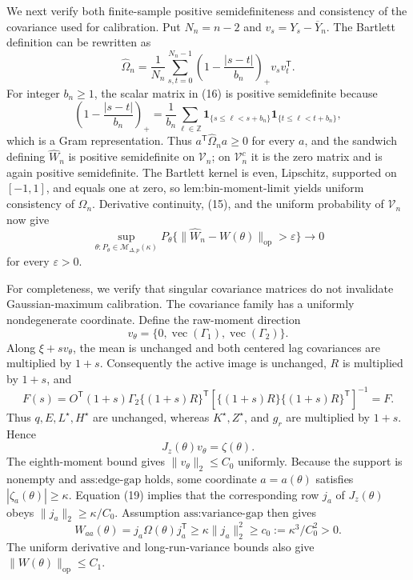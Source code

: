 We next verify both finite-sample positive semidefiniteness and consistency of the covariance used for calibration.  Put \(N_n=n-2\) and \(v_s=Y_s-\overline Y_n\).  The Bartlett definition can be rewritten as
\[
 \widehat\Omega_n
 =\frac1{N_n}\sum_{s,t=0}^{N_n-1}
 \left(1-\frac{|s-t|}{b_n}\right)_{+}v_sv_t^{\mathsf T}.
\tag{16}
\]
For integer \(b_n\geq1\), the scalar matrix in (16) is positive semidefinite because
\[
 \left(1-\frac{|s-t|}{b_n}\right)_{+}
 =\frac1{b_n}\sum_{\ell\in\mathbb Z}
 \mathbf1_{\{s\leq\ell<s+b_n\}}
 \mathbf1_{\{t\leq\ell<t+b_n\}},
\tag{17}
\]
which is a Gram representation.  Thus \(a^{\mathsf T}\widehat\Omega_n a\geq0\) for every \(a\), and the sandwich defining \(\widehat W_n\) is positive semidefinite on \(\mathcal V_n\); on \(\mathcal V_n^c\) it is the zero matrix and is again positive semidefinite.  The Bartlett kernel is even, Lipschitz, supported on \([-1,1]\), and equals one at zero, so \(\text{lem:bin-moment-limit}\) yields uniform consistency of \(\widehat\Omega_n\).  Derivative continuity, (15), and the uniform probability of \(\mathcal V_n\) now give
\[
 \sup_{\theta:P_\theta\in\mathcal M_{\Delta,p}(\kappa)}
 P_\theta\{\lVert\widehat W_n-W(\theta)\rVert_{\mathrm{op}}>\varepsilon\}
 \longrightarrow0
\tag{18}
\]
for every \(\varepsilon>0\).

For completeness, we verify that singular covariance matrices do not invalidate Gaussian-maximum calibration.  The covariance family has a uniformly nondegenerate coordinate.  Define the raw-moment direction
\[
 v_\theta=\{0,\operatorname{vec}(\Gamma_1),\operatorname{vec}(\Gamma_2)\}.
\]
Along \(\xi+s v_\theta\), the mean is unchanged and both centered lag covariances are multiplied by \(1+s\).  Consequently the active image is unchanged, \(R\) is multiplied by \(1+s\), and
\[
 F(s)=O^{\mathsf T}(1+s)\Gamma_2\{(1+s)R\}^{\mathsf T}
 \left[\{(1+s)R\}\{(1+s)R\}^{\mathsf T}\right]^{-1}=F.
\]
Thus \(q,E,L^\star,H^\star\) are unchanged, whereas \(K^\star,Z^\star\), and \(g_r\) are multiplied by \(1+s\).  Hence
\[
 J_z(\theta)v_\theta=\zeta(\theta).
\tag{19}
\]
The eighth-moment bound gives \(\lVert v_\theta\rVert_2\leq C_0\) uniformly.  Because the support is nonempty and \(\text{ass:edge-gap}\) holds, some coordinate \(a=a(\theta)\) satisfies \(|\zeta_a(\theta)|\geq\kappa\).  Equation (19) implies that the corresponding row \(j_a\) of \(J_z(\theta)\) obeys \(\lVert j_a\rVert_2\geq\kappa/C_0\).  Assumption \(\text{ass:variance-gap}\) then gives
\[
 W_{aa}(\theta)=j_a\Omega(\theta)j_a^{\mathsf T}
 \geq\kappa\lVert j_a\rVert_2^2
 \geq c_0:=\kappa^3/C_0^2>0.
\tag{20}
\]
The uniform derivative and long-run-variance bounds also give \(\lVert W(\theta)\rVert_{\mathrm{op}}\leq C_1\).

